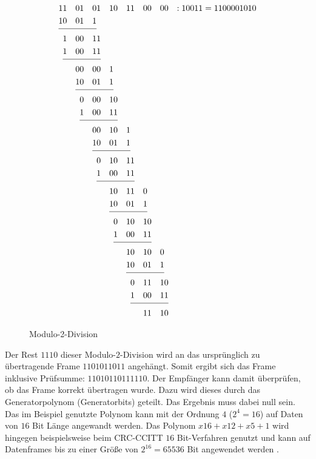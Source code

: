\begin{figure}[H]
	\jot-0.6mm
	\begin{alignat*}{14}
	1&1&0&1&0&1&1&0&1&1&0&0&0&0& : 10011=1100001010 \\
	1&0&0&1&1\\ \cline{1-5}
	&1&0&0&1&1& \\ 
	&1&0&0&1&1& \\ \cline{2-6}
	&&0&0&0&0&1& \\ 
	&&1&0&0&1&1& \\ \cline{3-7}
	&&&0&0&0&1&0& \\                                                 
	&&&1&0&0&1&1& \\ \cline{4-8}
	&&&&0&0&1&0&1& \\                                               
	&&&&1&0&0&1&1& \\ \cline{5-9}
	&&&&&0&1&0&1&1& \\                                           
	&&&&&1&0&0&1&1&  \\ \cline{6-10}                                                                                  
	&&&&&&1&0&1&1&0& \\                                           
	&&&&&&1&0&0&1&1& \\   \cline{7-11}                                                                                      
	&&&&&&&0&1&0&1&0& \\                                         
	&&&&&&&1&0&0&1&1& \\ \cline{8-12}                                                                                     
	&&&&&&&&1&0&1&0&0& \\                                       
	&&&&&&&&1&0&0&1&1& \\ \cline{9-13}                                                                               
	&&&&&&&&&0&1&1&1&0& \\                                     
	&&&&&&&&&1&0&0&1&1& \\ \cline{10-14}    
	&&&&&&&&&&1&1&1&0& 
	\end{alignat*}
	\caption{Modulo-2-Division} 
\end{figure}

Der Rest $1110$ dieser Modulo-$2$-Division wird an das
urspr{\"u}nglich zu {\"u}bertragende Frame $11 0101 1011$ angeh{\"a}ngt. Somit
ergibt sich das Frame inklusive Pr{\"u}fsumme: $11 0101 1011 1110$. Der
Empf{\"a}nger kann damit {\"u}berpr{\"u}fen, ob das Frame korrekt {\"u}bertragen
wurde. Dazu wird dieses durch das Generatorpolynom (Generatorbits) geteilt.
Das Ergebnis muss dabei null sein. Das im Beispiel genutzte Polynom kann mit der
Ordnung $4$ ($2^4=16$) auf Daten von $16$ Bit Länge angewandt werden. Das
Polynom $x16+x12+x5+1$ wird hingegen beispielsweise beim CRC-CCITT $16$ Bit-Verfahren
genutzt und kann auf Datenframes bis zu einer Gr{\"o}{\ss}e von $2^{16}=65536$
Bit angewendet werden \cite{web2}.

